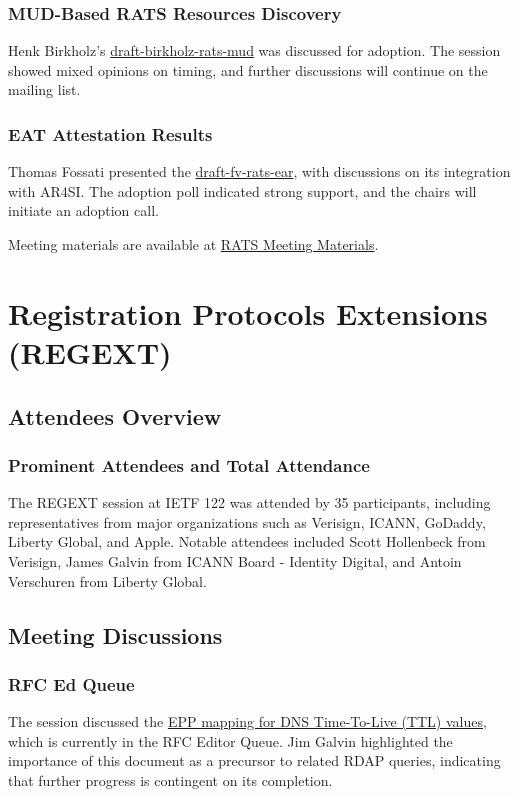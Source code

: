 \documentclass{article}
\begin{document}
\subsubsection{MUD-Based RATS Resources Discovery}
Henk Birkholz's \href{https://datatracker.ietf.org/doc/draft-birkholz-rats-mud/}{draft-birkholz-rats-mud} was discussed for adoption. The session showed mixed opinions on timing, and further discussions will continue on the mailing list.

\subsubsection{EAT Attestation Results}
Thomas Fossati presented the \href{https://datatracker.ietf.org/doc/draft-fv-rats-ear/}{draft-fv-rats-ear}, with discussions on its integration with AR4SI. The adoption poll indicated strong support, and the chairs will initiate an adoption call.

Meeting materials are available at \href{https://datatracker.ietf.org/meeting/122/materials/agenda-rats-00}{RATS Meeting Materials}.



\newpage

\section{Registration Protocols Extensions (REGEXT)}

\subsection{Attendees Overview}
\subsubsection{Prominent Attendees and Total Attendance}
The REGEXT session at IETF 122 was attended by 35 participants, including representatives from major organizations such as Verisign, ICANN, GoDaddy, Liberty Global, and Apple. Notable attendees included Scott Hollenbeck from Verisign, James Galvin from ICANN Board - Identity Digital, and Antoin Verschuren from Liberty Global.

\subsection{Meeting Discussions}
\subsubsection{RFC Ed Queue}
The session discussed the \href{https://datatracker.ietf.org/doc/draft-ietf-regext-epp-ttl/}{EPP mapping for DNS Time-To-Live (TTL) values}, which is currently in the RFC Editor Queue. Jim Galvin highlighted the importance of this document as a precursor to related RDAP queries, indicating that further progress is contingent on its completion.
\end{document}
